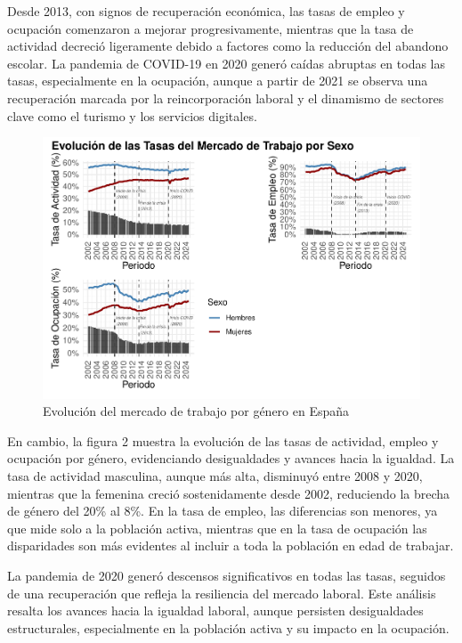 \documentclass[Universitat de
València,article,submit,moreauthors,pdftex]{Definitions/mdpi}
\begin{document}
Desde 2013, con signos de recuperación económica, las tasas de empleo y
ocupación comenzaron a mejorar progresivamente, mientras que la tasa de
actividad decreció ligeramente debido a factores como la reducción del
abandono escolar. La pandemia de COVID-19 en 2020 generó caídas abruptas
en todas las tasas, especialmente en la ocupación, aunque a partir de
2021 se observa una recuperación marcada por la reincorporación laboral
y el dinamismo de sectores clave como el turismo y los servicios
digitales.\newline

\begin{figure}[h]

{\centering \includegraphics[width=1\linewidth]{ProyectoAED2024_files/figure-latex/unnamed-chunk-28-1} 

}

\caption{Evolución del mercado de trabajo por género en España}\label{fig:unnamed-chunk-28}
\end{figure}

En cambio, la figura 2 muestra la evolución de las tasas de actividad,
empleo y ocupación por género, evidenciando desigualdades y avances
hacia la igualdad. La tasa de actividad masculina, aunque más alta,
disminuyó entre 2008 y 2020, mientras que la femenina creció
sostenidamente desde 2002, reduciendo la brecha de género del 20\% al
8\%. En la tasa de empleo, las diferencias son menores, ya que mide solo
a la población activa, mientras que en la tasa de ocupación las
disparidades son más evidentes al incluir a toda la población en edad de
trabajar.

La pandemia de 2020 generó descensos significativos en todas las tasas,
seguidos de una recuperación que refleja la resiliencia del mercado
laboral. Este análisis resalta los avances hacia la igualdad laboral,
aunque persisten desigualdades estructurales, especialmente en la
población activa y su impacto en la ocupación.\newline
\end{document}
